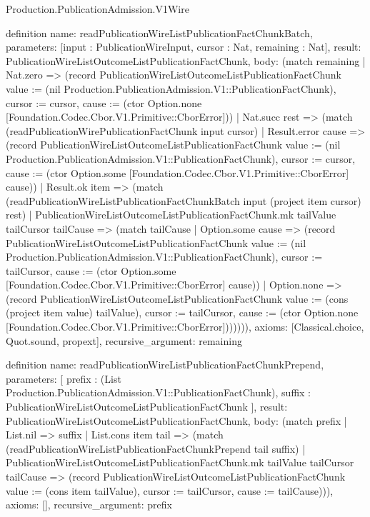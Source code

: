 \begin{lexlean}{Production.PublicationAdmission.V1Wire}
\begin{semanticmodule}
definition{
  name: readPublicationWireListPublicationFactChunkBatch,
  parameters: [input : PublicationWireInput, cursor : Nat, remaining : Nat],
  result: PublicationWireListOutcomeListPublicationFactChunk,
  body: (match remaining
    | Nat.zero => (record PublicationWireListOutcomeListPublicationFactChunk {value := (nil Production.PublicationAdmission.V1::PublicationFactChunk), cursor := cursor, cause := (ctor Option.none [Foundation.Codec.Cbor.V1.Primitive::CborError])})
    | Nat.succ rest => (match (readPublicationWirePublicationFactChunk input cursor)
      | Result.error cause => (record PublicationWireListOutcomeListPublicationFactChunk {value := (nil Production.PublicationAdmission.V1::PublicationFactChunk), cursor := cursor, cause := (ctor Option.some [Foundation.Codec.Cbor.V1.Primitive::CborError] cause)})
      | Result.ok item => (match (readPublicationWireListPublicationFactChunkBatch input (project item cursor) rest)
        | PublicationWireListOutcomeListPublicationFactChunk.mk tailValue tailCursor tailCause => (match tailCause
          | Option.some cause => (record PublicationWireListOutcomeListPublicationFactChunk {value := (nil Production.PublicationAdmission.V1::PublicationFactChunk), cursor := tailCursor, cause := (ctor Option.some [Foundation.Codec.Cbor.V1.Primitive::CborError] cause)})
          | Option.none => (record PublicationWireListOutcomeListPublicationFactChunk {value := (cons (project item value) tailValue), cursor := tailCursor, cause := (ctor Option.none [Foundation.Codec.Cbor.V1.Primitive::CborError])}))))),
  axioms: [Classical.choice, Quot.sound, propext],
  recursive_argument: remaining
}

definition{
  name: readPublicationWireListPublicationFactChunkPrepend,
  parameters: [
    prefix : (List Production.PublicationAdmission.V1::PublicationFactChunk),
    suffix : PublicationWireListOutcomeListPublicationFactChunk
  ],
  result: PublicationWireListOutcomeListPublicationFactChunk,
  body: (match prefix
    | List.nil => suffix
    | List.cons item tail => (match (readPublicationWireListPublicationFactChunkPrepend tail suffix)
      | PublicationWireListOutcomeListPublicationFactChunk.mk tailValue tailCursor tailCause => (record PublicationWireListOutcomeListPublicationFactChunk {value := (cons item tailValue), cursor := tailCursor, cause := tailCause}))),
  axioms: [],
  recursive_argument: prefix
}


\end{semanticmodule}
\end{lexlean}
